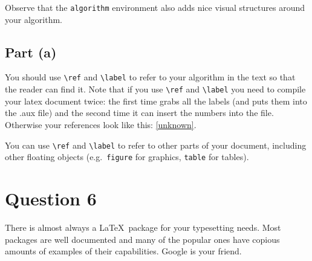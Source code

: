 \documentclass{article} %
\begin{document}
Observe that the \texttt{algorithm} environment also adds nice visual structures around your algorithm.

\subsection*{Part (a)}

You should use \verb|\ref| and \verb|\label| to refer to your algorithm in the text so that the reader can find it.  Note that if you use \verb|\ref| and \verb|\label| you need to compile your latex document twice: the first time grabs all the labels (and puts them into the .aux file) and the second time it can insert the numbers into the file.  Otherwise your references look like this: \ref{unknown}.


You can use \verb|\ref| and \verb|\label| to refer to other parts of your document, including other floating objects (e.g.\ \texttt{figure} for graphics, \texttt{table} for tables). 


\section*{Question 6}
There is almost always a \LaTeX\ package for your typesetting needs.  Most packages are well documented and many of the popular ones have copious amounts of examples of their capabilities.  Google is your friend.
\end{document}
